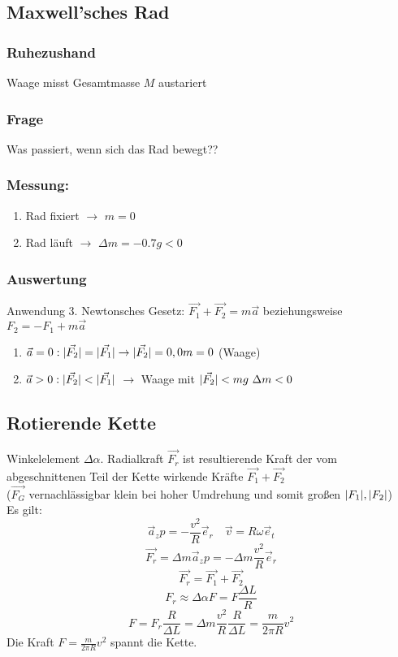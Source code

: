\documentclass[a4paper]{scrartcl}
\DeclarePairedDelimiter\abs{\lvert}{\rvert}%
\renewcommand{\v}[1]{\vec{#1}}
\theoremstyle{definition}
\theoremstyle{plain}
\theoremstyle{plain}
\theoremstyle{remark}
\theoremstyle{remark}
\theoremstyle{remark}
\begin{document}
\subsection{Maxwell'sches Rad}
\label{sec-3-3}
\subsubsection{Ruhezushand}
\label{sec-3-3-1}
Waage misst Gesamtmasse $M$ austariert
\subsubsection{Frage}
\label{sec-3-3-2}
Was passiert, wenn sich das Rad bewegt??
\subsubsection{Messung:}
\label{sec-3-3-3}
\begin{enumerate}
\item Rad fixiert $\rightarrow$ $m = 0$
\item Rad läuft $\rightarrow$ $\Delta m  = -0.7 g < 0$
\end{enumerate}
\subsubsection{Auswertung}
\label{sec-3-3-4}
Anwendung 3. Newtonsches Gesetz:
$\v{F_1} + \v{F_2} = m\v a$ beziehungsweise $F_2 = - F_1 + m\v a$
\begin{enumerate}
\item $\v a = 0: \abs{\v{F_2}} = \abs{\v{F_1}} \rightarrow \abs{\v{F_2}} = 0, 0 m = 0$ (Waage)
\item $\v a > 0: \abs{\v{F_2}} < \abs{\v{F_1}}$ $\rightarrow$ Waage mit $\abs{\v{F_2}} < m g~\Delta{m} < 0$
\end{enumerate}
\subsection{Rotierende Kette}
\label{sec-3-4}
Winkelelement $\Delta \alpha$. Radialkraft $\v{F_r}$ ist resultierende Kraft der vom abgeschnittenen Teil der Kette wirkende Kräfte $\v{F_1} + \v{F_2}$ \\
   ($\v{F_G}$ vernachlässigbar klein bei hoher Umdrehung und somit großen $\abs{F_1},\abs{F_2}$) \\
   Es gilt:
\[\v a_zp = -\frac{v^2}{R}\v e_r\quad \v v = R\omega \v e_t\]
\[\v{F_r} = \Delta m \v a_zp = -\Delta m \frac{v^2}{R}\v e_r\]
\[\v{F_r} = \v{F_1} + \v{F_2}\]
\[F_r \approx \Delta \alpha F = F\frac{\Delta L}{R}\]
\[F = F_r \frac{R}{\Delta L} = \Delta m \frac{v^2}{R}\frac{R}{\Delta L} = \frac{m}{2\pi R}v^2\]
Die Kraft $F = \frac{m}{2\pi R}v^2$ spannt die Kette.
\end{document}
